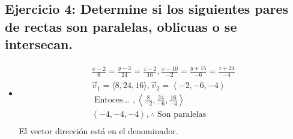 \documentclass{article}
\begin{document}
\subsection{Ejercicio 4: Determine si los siguientes pares de rectas son paralelas, oblicuas o se intersecan.}
\begin{itemize}
    \item \begin{align*}
        \frac{x-2}{8} = \frac{y-3}{24} = \frac{z-2}{16} , \frac{x-10}{-2} = \frac{y+15}{-6} = \frac{z+24}{-4} \\ 
        \vec{v}_1 = \langle 8,24,16 \rangle, \vec{v}_2  = \left\langle -2,-6,-4 \right\rangle \\ 
        \text{  Entoces...  }, \left\langle \frac{8}{-2}, \frac{24}{-6} , \frac{16}{-4}   \right\rangle  \\ 
        \left\langle -4,-4,-4   \right\rangle, \therefore \text{  Son paralelas  } \\   
    \end{align*}
    El vector dirección está en el denominador.
    

\end{itemize}
\end{document}
